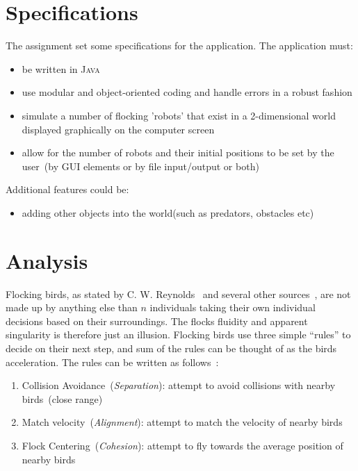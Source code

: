 \documentclass[a4paper,twoside, 10pt]{report}
\begin{document}
\section{Specifications}
\label{sec:specification}

The assignment set some specifications for the application. The application must:
\begin{itemize}
	\item be written in \textsc{Java}
    \item use modular and object-oriented coding and handle errors in a robust fashion
    \item simulate a number of flocking 'robots' that exist in a 2-dimensional world displayed graphically on the computer screen
    \item allow for the number of robots and their initial positions to be set by the user~(by GUI elements or by file input/output or both)
\end{itemize}

Additional features could be: 
\begin{itemize}
	\item adding other objects into the world(such as predators, obstacles etc)
\end{itemize}




\section{Analysis}
\label{sec:analysis}
Flocking birds, as stated by C. W. Reynolds~\cite{reynolds87behavioral} and several other sources~\cite{Hemelrikj11CausesOfFlocks, Wiki15Flocking}, are not made up by anything else than $n$ individuals taking their own individual decisions based on their surroundings. The flocks fluidity and apparent singularity is therefore just an illusion. Flocking birds use three simple ``rules'' to decide on their next step, and sum of the rules can be thought of as the birds acceleration. The rules can be written as follows~\cite{reynolds87behavioral}:

\begin{enumerate}
  \item Collision Avoidance~(\textit{Separation}): attempt to avoid collisions with nearby birds~(close range)
  \item Match velocity~(\textit{Alignment}): attempt to match the velocity of nearby birds
  \item Flock Centering~(\textit{Cohesion}): attempt to fly towards the average position of nearby birds
\end{enumerate}
\end{document}
